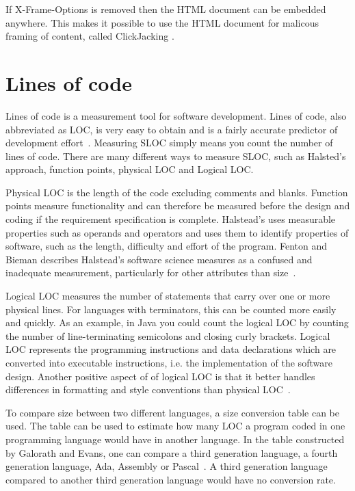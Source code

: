 If X-Frame-Options is removed then the HTML document can be embedded anywhere. This makes it possible to use the HTML document for malicous framing of content, called ClickJacking \cite{law2010}.

\section{Lines of code}\label{sec:lines-of-code}
Lines of code is a measurement tool for software development. Lines of code, also abbreviated as LOC, is very easy to obtain and is a fairly accurate predictor of development effort~\cite[p.~63]{galorath2006}. Measuring SLOC simply means you count the number of lines of code. There are many different ways to measure SLOC, such as Halsted’s approach, function points, physical LOC and Logical LOC. 

Physical LOC is the length of the code excluding comments and blanks. Function points measure functionality and can therefore be measured before the design and coding if the requirement specification is complete\cite[p.~187]{galorath2006}. Halstead’s uses measurable properties such as operands and operators and uses them to identify properties of software, such as the length, difficulty and effort of the program. Fenton and Bieman describes Halstead’s software science measures as a confused and inadequate measurement, particularly for other attributes than size~\cite[p.~345]{fenton2015}.

Logical LOC measures the number of statements that carry over one or more physical lines.  For languages with terminators, this can be counted more easily and quickly. As an example, in Java you could count the logical LOC by counting the number of line-terminating semicolons and closing curly brackets. Logical LOC represents the programming instructions and data declarations which are converted into executable instructions, i.e. the implementation of the software design. Another positive aspect of of logical LOC is that it better handles differences in formatting and style conventions than physical LOC~\cite[p.~155]{galorath2006}.

To compare size between two different languages, a size conversion table can be used. The table can be used to estimate how many LOC a program coded in one programming language would have in another language. In the table constructed by Galorath and Evans, one can compare a third generation language, a fourth generation language, Ada, Assembly or Pascal~\cite[p.~163]{galorath2006}. A third generation language compared to another third generation language would have no conversion rate. 

